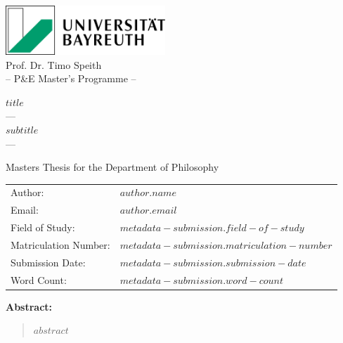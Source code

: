 \begin{titlepage}
  \begin{center}
    \includegraphics[width=6cm]{article/latex/uni-bayreuth-logo.png}\\[1cm]
    {\Large Prof. Dr. Timo Speith}\\[0.5cm]
    {\large -- P\&E Master's Programme --}\\[2cm]
  \end{center}

  \begin{center}
    \LARGE\textbf{$title$}\\[1cm]
    {\large --- \\[0.5cm] $subtitle$ \\[0.5cm] ---}\\[2cm]
  \end{center}
  
  \begin{center}
    \large Masters Thesis for the Department of Philosophy
  \end{center}
  
  \begin{center}
    \begin{tabular}{ll}
      \toprule
      Author: & $author.name$ \\
      Email: & $author.email$ \\
      Field of Study: & $metadata-submission.field-of-study$ \\
      Matriculation Number: & $metadata-submission.matriculation-number$ \\
      Submission Date: & $metadata-submission.submission-date$ \\
      Word Count: & $metadata-submission.word-count$ \\
      \bottomrule
    \end{tabular}
  \end{center}
  
  \begin{center}
    \large\textbf{Abstract:}
  \end{center}
  
  \begin{quotation}
    $abstract$
  \end{quotation}
\end{titlepage}
